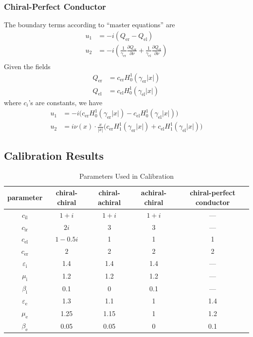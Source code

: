 \subsubsection{Chiral-Perfect Conductor}

The boundary terms according to ``master equations'' are
\begin{align*}
  u_1 &= -i(Q_\text{er} - Q_\text{el}) \\
  u_2 &= -i\left(\frac{1}{\gamma_\text{er}}\frac{\partial Q_\text{er}}{\partial\nu} + \frac{1}{\gamma_\text{el}}\frac{\partial Q_\text{el}}{\partial\nu}\right) \\
\end{align*}
Given the fields
\begin{align*}
  Q_\text{er} &= c_\text{er}H_0^1(\gamma_\text{er}|x|) \\
  Q_\text{el} &= c_\text{el}H_0^1(\gamma_\text{el}|x|)
\end{align*}
where $c_i$'s are constants, we have
\begin{align*}
  u_1 &= -i \bigl(c_\text{er} H_0^1(\gamma_\text{er}|x|)-c_\text{el} H_0^1(\gamma_\text{el}|x|)\bigr) \\
  u_2 &= i \nu(x)\cdot\frac{x}{|x|} \bigl(c_\text{er} H_1^1(\gamma_\text{er}|x|)+c_\text{el} H_1^1(\gamma_\text{el}|x|)\bigr)
\end{align*}

\subsection{Calibration Results}

\begin{table}
  \centering
  \renewcommand{\arraystretch}{1.1}
  \caption{Parameters Used in Calibration}
  \begin{tabular}{@{}ccccc@{}}
    \toprule
    parameter  & chiral-chiral & chiral-achiral & achiral-chiral & chiral-perfect conductor \\ 
    \midrule
    $c_\text{il}$ & $1+i$ & $1+i$ & $1+i$ & ---\\
    $c_\text{ir}$ & $2i$ & 3 & 3 & ---\\
    $c_\text{el}$ & $1-0.5i$ & 1 & 1 & 1\\
    $c_\text{er}$ & $2$ & 2 & 2 & 2\\
    $\varepsilon_\text{i}$ & 1.4 & 1.4 & 1.4 & ---\\
    $\mu_\text{i}$ & 1.2 & 1.2 & 1.2 & ---\\
    $\beta_\text{i}$ & 0.1 & 0 & 0.1 & ---\\
    $\varepsilon_\text{e}$ & 1.3 & 1.1 & 1 & 1.4\\
    $\mu_\text{e}$ & 1.25 & 1.15 & 1 & 1.2\\
    $\beta_\text{e}$ & 0.05 & 0.05 & 0 & 0.1\\
    \bottomrule
  \end{tabular}
\end{table}

